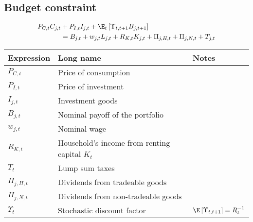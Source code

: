 \subsection{Budget constraint}
\begin{align}
    P_{C,t}C_{j,t} & + P_{I,t}I_{j,t} + \E_t\left[ \Upsilon_{t, t+1}B_{j, t+1}  \right]                          \\
                   & = B_{j, t} + w_{j, t}L_{j, t} + R_{K, t}K_{j, t} + \Pi_{j, H, t} + \Pi_{j, N, t} + T_{j, t}
\end{align}

\begin{tabularx}{\textwidth}{llX}
    \textbf{Expression} & \textbf{Long name}                            & \textbf{Notes}                                    \\ \hline \hline
    $P_{C,t}$           & Price of consumption                          &                                                   \\
    $P_{I,t}$           & Price of investment                           &                                                   \\
    $I_{j,t}$           & Investment goods                              &                                                   \\
    $B_{j,t}$           & Nominal payoff of the portfolio               &                                                   \\
    $w_{j,t}$           & Nominal wage                                  &                                                   \\
    $R_{K,t}$           & Household's income from renting capital $K_t$ &                                                   \\
    $T_{t}$             & Lump sum taxes                                &                                                   \\
    $\Pi_{j, H, t}$     & Dividends from tradeable goods                &                                                   \\
    $\Pi_{j, N, t}$     & Dividends from non-tradeable goods            &                                                   \\
    $\Upsilon_{t}$      & Stochastic discount factor                    & $\E \left[ \Upsilon_{t, t+1}\right] = R_{t}^{-1}$
\end{tabularx}

